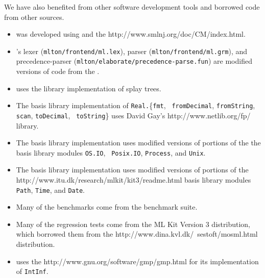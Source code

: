 We have also benefited from other software development tools and borrowed code
from other sources.

\begin{itemize}

\item
{\mlton} was developed using
and the
		  {http://www.smlnj.org/doc/CM/index.html}.

\item
{\mlton}'s lexer ({\tt mlton/frontend/ml.lex}), 
parser ({\tt mlton/frontend/ml.grm}),
and precedence-parser ({\tt mlton/elaborate/precedence-parse.fun})
are modified versions of code from the {\smlnj}.

\item
{\mlton} uses the {\smlnj} library implementation of splay trees.

\item
The {\mlton} basis library implementation of {\tt Real.}\{{\tt fmt}, {\tt
fromDecimal}, {\tt fromString}, {\tt scan}, {\tt toDecimal}, {\tt
toString}\} uses David Gay's
		  {http://www.netlib.org/fp/}
library.

\item
The {\mlton} basis library implementation uses modified versions of
portions of the the {\smlnj} basis library modules {\tt OS.IO}, {\tt
Posix.IO}, {\tt Process}, and {\tt Unix}.

\item
The {\mlton} basis library implementation uses modified versions of
portions of the
		  {http://www.itu.dk/research/mlkit/kit3/readme.html}
basis library modules {\tt Path}, {\tt Time}, and {\tt Date}.

\item
Many of the benchmarks come from the {\smlnj} benchmark suite.

\item
Many of the regression tests come from the ML Kit Version 3 distribution, which
borrowed them from the
		  {http://www.dina.kvl.dk/~sestoft/mosml.html}
distribution.

\item
{\mlton} uses the
		  {http://www.gnu.org/software/gmp/gmp.html}
for its implementation of {\tt IntInf}.

\end{itemize}
